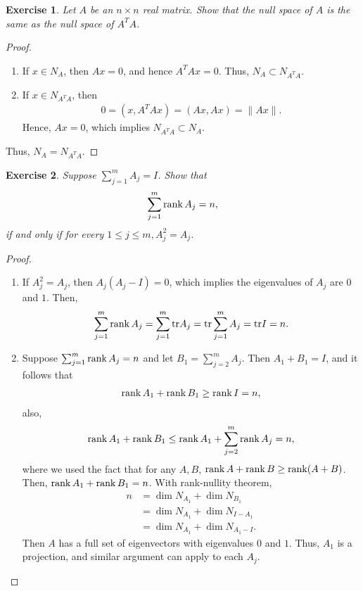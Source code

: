 \documentclass[11pt]{book}
\newtheorem{exercise}{Exercise}[section]
\theoremstyle{definition}
\numberwithin{equation}{subsection}
\begin{document}
\medskip

\begin{exercise}
Let $A$ be an $n \times n$ real matrix. Show that the null space of $A$ is the same
as the null space of $A^T A$.
\end{exercise}
\begin{proof}
~\begin{enumerate}[label=(\alph*)]
    \item If $x \in N_A$, then $Ax = 0$, and hence $A^TAx = 0$. Thus, $N_A \subset N_{A^TA}$.
    
    \item If $x \in N_{A^TA}$, then
    \begin{align*}
        0 = \left(x, A^TA x\right) = \left(Ax, A x\right)  = \|Ax\|.
    \end{align*}
    Hence, $Ax = 0$, which implies $N_{A^TA} \subset N_A$.
\end{enumerate}
Thus, $N_A = N_{A^TA}$.
\end{proof}

\medskip

\begin{exercise}{\bf *}
Suppose $\sum^m_{j=1} A_j = I$. Show that 
\begin{align*}
    \sum^m_{j=1} \rank A_j = n,
\end{align*}
if and only if for every $1 \leq j \leq m, A_j^2 = A_j$.
\end{exercise}
\begin{proof}
~\begin{enumerate}[label=(\alph*)]
    \item If $A_j^2 = A_j$, then $A_j \left( A_j - I\right) = 0$, which implies the eigenvalues of $A_j$ are $0$ and $1$. Then,
    \begin{align*}
        \sum^m_{j=1} \rank A_j = \sum^m_{j=1} {\rm tr} A_j = {\rm tr} \sum^m_{j=1} A_j = {\rm tr} I = n.
    \end{align*}
    
    \item Suppose $\sum^m_{j=1} \rank A_j = n$ and let $B_1 = \sum^m_{j=2} A_j$. Then $A_1 + B_1 = I$, and it follows that 
    \begin{align*}
        \rank A_1 + \rank B_1 \geq \rank I = n,
    \end{align*}
    also,
    \begin{align}
        \rank A_1 + \rank B_1 \leq \rank A_1 + \sum^m_{j=2} \rank A_j = n,
    \end{align}
    where we used the fact that for any $A, B$, $\rank A + \rank B \geq \rank (A+B)$. Then, $\rank A_1 + \rank B_1 = n$. With rank-nullity theorem, 
    \begin{align*}
        n & = \dim N_{A_1} + \dim N_{B_1} \\
          & = \dim N_{A_1} + \dim N_{I - A_1} \\
          & = \dim N_{A_1} + \dim N_{A_1 - I}.
    \end{align*}
    Then $A$ has a full set of eigenvectors with eigenvalues $0$ and $1$. Thus, $A_1$ is a projection, and similar argument can apply to each $A_j$.
\end{enumerate}
\end{proof}
\end{document}
